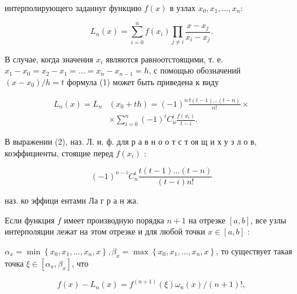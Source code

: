 \documentclass[10pt]{article}
\begin{document}
интерполирующего заданнуг функцию $f(x)$ в узлах $x_{0}, x_{1}, \ldots, x_{n}:$



\[

L_{n}(x)=\sum_{i=0}^{n} f\left(x_{i}\right) \prod_{j \neq i} \frac{x-x_{j}}{x_{i}-x_{j}} .

\]



В случае, когда значения $x_{i}$ являются равноотстоящими, т. е. $x_{1}-x_{0}=x_{2}-x_{1}=\ldots=x_{n}-x_{n-1}=h$, с помощью обозначений $\left(x-x_{0}\right) / h=t$ формула (1) может быть приведена к виду



\[

\begin{aligned}

L_{n}(x)=L_{n} & \left(x_{0}+t h\right)=(-1)^{n} \frac{t(t-1) \ldots(t-n)}{n !} \times \\

& \times \sum_{i=0}^{n}(-1)^{i} C_{n}^{i} \frac{f\left(x_{i}\right)}{t-i} .

\end{aligned}

\]



В выражении (2), наз. Л. и. ф. для р а в н о о т с т оя щ и х у з л о в, коэффициенты, стоящие перед $f\left(x_{i}\right)$ :



\[

(-1)^{n-i} C_{n}^{i} \frac{t(t-1) \ldots(t-n)}{(t-i) n !}

\]



наз. ко эффици ентами Ла г р а н жа.



Если функция $f$ имеет производную порядка $n+1$ на отрезке $[a, b]$, все узлы интерполяции лежат на этом отрезке и для любой точки $x \in[a, b]$ :



$\alpha_{x}=\min \left\{x_{0}, x_{1}, \ldots, x_{n}, x\right\}, \beta_{x}=\max \left\{x_{0}, x_{1}, \ldots, x_{n}, x\right\}$, то существует такая точка $\xi \in\left[\alpha_{x}, \beta_{x}\right]$, что



\[

f(x)-L_{n}(x)=f^{(n+1)}(\xi) \omega_{n}(x) /(n+1) !,

\]
\end{document}
